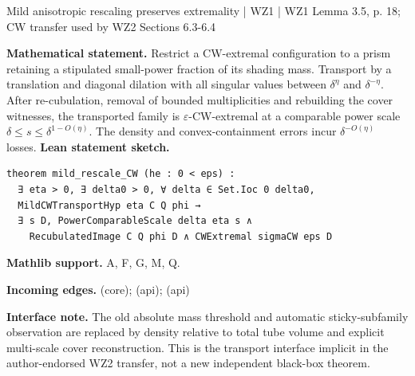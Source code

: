 \documentclass[10pt,a4paper]{article}
\newcommand{\nodecard}[1]{\hyperlink{node-#1}{\texttt{\detokenize{#1}}}}
\begin{document}
\begin{minipage}{\linewidth}
\hypertarget{node-L3_5}{}
\begin{tcolorbox}[colback=white,colframe=setupfg,colbacktitle=setupbg,coltitle=ink,boxrule=0.45pt,arc=1.6mm,left=3mm,right=3mm,top=2mm,bottom=2mm,title={\sffamily\bfseries WZ1 Lemma 3.5 / CW \hfill \texttt{L3\_5}}]
{\sffamily\small\color{muted}Mild anisotropic rescaling preserves extremality | WZ1 | WZ1 Lemma 3.5, p. 18; CW transfer used by WZ2 Sections 6.3-6.4}\par
\textbf{Mathematical statement.} Restrict a CW-extremal configuration to a prism retaining a stipulated small-power fraction of its shading mass.
Transport by a translation and diagonal dilation with all singular values between $\delta^\eta$ and $\delta^{-\eta}$.
After re-cubulation, removal of bounded multiplicities and rebuilding the cover witnesses, the transported family is $\varepsilon$-CW-extremal at a comparable power scale $\delta\le s\le\delta^{1-O(\eta)}$.
The density and convex-containment errors incur $\delta^{-O(\eta)}$ losses.
\smallskip\textbf{Lean statement sketch.}
\begin{Verbatim}[fontsize=\small,breaklines=true,breakanywhere=true,tabsize=2]
theorem mild_rescale_CW (he : 0 < eps) :
  ∃ eta > 0, ∃ delta0 > 0, ∀ delta ∈ Set.Ioc 0 delta0,
  MildCWTransportHyp eta C Q phi →
  ∃ s D, PowerComparableScale delta eta s ∧
    RecubulatedImage C Q phi D ∧ CWExtremal sigmaCW eps D
\end{Verbatim}
{\footnotesize\textbf{Mathlib support.} A, F, G, M, Q.\par
\textbf{Incoming edges.} \nodecard{W2D6_1} (core); \nodecard{Iaffine} (api); \nodecard{Iwolffbalance} (api)\par}
{\footnotesize\textbf{Interface note.} The old absolute mass threshold and automatic sticky-subfamily observation are replaced by density relative to total tube volume and explicit multi-scale cover reconstruction. This is the transport interface implicit in the author-endorsed WZ2 transfer, not a new independent black-box theorem.}
\end{tcolorbox}\end{minipage}\par\medskip
\end{document}
